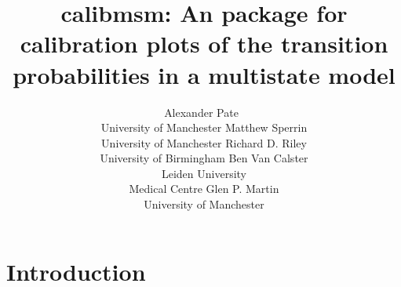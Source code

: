 \documentclass[article,shortnames]{jss}
\author{Alexander Pate~\orcidlink{0000-0002-0849-3458}\\University of Manchester
  \And Matthew Sperrin\\University of Manchester
  \AND Richard D. Riley\\University of Birmingham
  \And Ben Van Calster\\Leiden University\\Medical Centre
  \And Glen P. Martin\\University of Manchester}
\title{calibmsm: An \proglang{R} package for calibration plots of the transition probabilities in a multistate model}
\begin{document}


\section[Introduction]{Introduction} \label{sec:intro}

%
\end{document}

